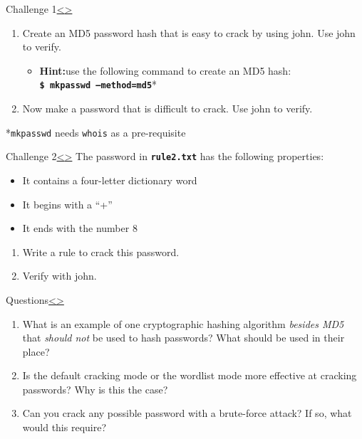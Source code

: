\documentclass[12pt]{extarticle}
\newcommand{\code}[1]{\texttt{\bfseries#1}}
\newenvironment{instructionblock}{\Large\bgroup}{\egroup}
\newcommand{\bi}{\begin{itemize}}
\newcommand{\ei}{\end{itemize}}
\begin{document}
	
	
	\pagebreak
	\begin{slide}{Challenge 1}{\hyperref[slide 13]{\textless}\hyperref[slide 15]{\textgreater}}
		\vskip 5pt
		\begin{instructionblock}
			\begin{enumerate}
				\item Create an MD5 password hash that is easy to crack by using john. Use john to verify.
				\bi
				\item\textbf{Hint:}\newline use the following command to create an MD5 hash:\\
				\code{\$ mkpasswd --method=md5}*
				\ei 
				\item Now make a password that is difficult to crack. Use john to verify.
			\end{enumerate}
		\end{instructionblock}
	\end{slide}
	*\texttt{mkpasswd} needs \texttt{whois} as a pre-requisite
	
	
	\pagebreak
	\begin{slide}{Challenge 2}{\hyperref[slide 14]{\textless}\hyperref[slide 16]{\textgreater}}
		\vskip 5pt
		\begin{instructionblock}
			The password in \code{rule2.txt} has the following properties:
			\begin{itemize}
				\item It contains a four-letter dictionary word
				\item It begins with a ``+''
				\item It ends with the number 8
			\end{itemize}
			\begin{enumerate}
				\item Write a rule to crack this password.
				\item Verify with john.
			\end{enumerate}
		\end{instructionblock}
	\end{slide}
	\vfill
	
	
	
	
	\pagebreak
	\begin{slide}{Questions}{\hyperref[slide 15]{\textless}\hyperref[slide 17]{\textgreater}}
		\vskip 10pt
		\begin{instructionblock}
			\begin{enumerate}
				\item What is an example of one cryptographic hashing algorithm \textit{besides MD5} that \textit{should not} be used to hash passwords? What should be used in their place?
				\item Is the default cracking mode or the wordlist mode more effective at cracking passwords? Why is this the case?
				\item Can you crack any possible password with a brute-force attack? If so, what would this require?
			\end{enumerate}
		\end{instructionblock}
	\end{slide}
	
\end{document}
